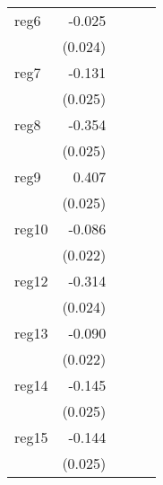 {\begin{longtable}{l*{4}{D{.}{.}{-1}}}
\addlinespace
reg6        &      -0.025         &                     &                     &                     \\
            &     (0.024)         &                     &                     &                     \\
\addlinespace
reg7        &      -0.131\sym{***}&                     &                     &                     \\
            &     (0.025)         &                     &                     &                     \\
\addlinespace
reg8        &      -0.354\sym{***}&                     &                     &                     \\
            &     (0.025)         &                     &                     &                     \\
\addlinespace
reg9        &       0.407\sym{***}&                     &                     &                     \\
            &     (0.025)         &                     &                     &                     \\
\addlinespace
reg10       &      -0.086\sym{***}&                     &                     &                     \\
            &     (0.022)         &                     &                     &                     \\
\addlinespace
reg12       &      -0.314\sym{***}&                     &                     &                     \\
            &     (0.024)         &                     &                     &                     \\
\addlinespace
reg13       &      -0.090\sym{***}&                     &                     &                     \\
            &     (0.022)         &                     &                     &                     \\
\addlinespace
reg14       &      -0.145\sym{***}&                     &                     &                     \\
            &     (0.025)         &                     &                     &                     \\
\addlinespace
reg15       &      -0.144\sym{***}&                     &                     &                     \\
            &     (0.025)         &                     &                     &                     \\

\end{longtable}}
